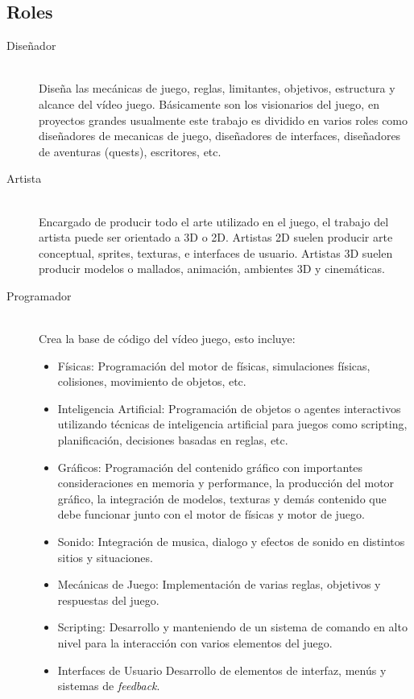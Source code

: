 \subsection{Roles}
\small
\begin{description}
\item[Diseñador] \hfill \\
Diseña las mecánicas de juego, reglas, limitantes, objetivos, estructura y alcance del vídeo juego. Básicamente son los visionarios del juego, en proyectos grandes usualmente este trabajo es dividido en varios roles como diseñadores de mecanicas de juego, diseñadores de interfaces, diseñadores de aventuras (quests), escritores, etc.
\item[Artista] \hfill \\
Encargado de producir todo el arte utilizado en el juego, el trabajo del artista puede ser orientado a 3D o 2D. Artistas 2D suelen producir arte conceptual, sprites, texturas, e interfaces de usuario. Artistas 3D suelen producir modelos o mallados, animación, ambientes 3D y cinemáticas.
\normalsize
\item[Programador] \hfill \\
Crea la base de código del vídeo juego, esto incluye:
\begin{itemize}
\item Físicas: Programación del motor de físicas, simulaciones físicas, colisiones, movimiento de objetos, etc.
\item Inteligencia Artificial: Programación de objetos o agentes interactivos utilizando técnicas de inteligencia artificial para juegos como scripting, planificación, decisiones basadas en reglas, etc.
\item Gráficos: Programación del contenido gráfico con importantes consideraciones en memoria y performance, la producción del motor gráfico, la integración de modelos, texturas y demás contenido que debe funcionar junto con el motor de físicas y motor de juego.
\item Sonido: Integración de musica, dialogo y efectos de sonido en distintos sitios y situaciones. 
\item Mecánicas de Juego: Implementación de varias reglas, objetivos y respuestas del juego. 
\item Scripting: Desarrollo y manteniendo de un sistema de comando en alto nivel para la interacción con varios elementos del juego.
\item Interfaces de Usuario
Desarrollo de elementos de interfaz, menús y sistemas de \emph{feedback}.

\end{itemize}
\end{description}
